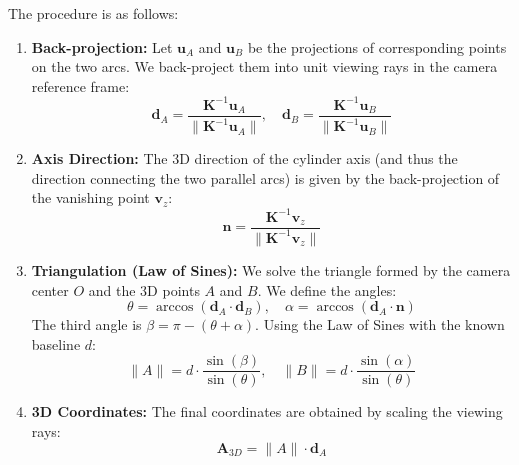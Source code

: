 \documentclass[a4paper,11pt]{article}
\newcommand{\matr}[1]{\bm{#1}}     %
\newcommand{\vect}[1]{\mathbf{#1}}  %
\begin{document}
The procedure is as follows:
\begin{enumerate}
    \item \textbf{Back-projection:} Let $\vect{u}_A$ and $\vect{u}_B$ be the projections of corresponding points on the two arcs. We back-project them into unit viewing rays in the camera reference frame:
    \begin{equation}
        \vect{d}_A = \frac{\matr{K}^{-1}\vect{u}_A}{\|\matr{K}^{-1}\vect{u}_A\|}, \quad \vect{d}_B = \frac{\matr{K}^{-1}\vect{u}_B}{\|\matr{K}^{-1}\vect{u}_B\|}
    \end{equation}
    
    \item \textbf{Axis Direction:} The 3D direction of the cylinder axis (and thus the direction connecting the two parallel arcs) is given by the back-projection of the vanishing point $\vect{v}_z$:
    \begin{equation}
        \vect{n} = \frac{\matr{K}^{-1}\vect{v}_z}{\|\matr{K}^{-1}\vect{v}_z\|}
    \end{equation}
    
    \item \textbf{Triangulation (Law of Sines):} We solve the triangle formed by the camera center $O$ and the 3D points $A$ and $B$. We define the angles:
    \begin{equation}
        \theta = \arccos(\vect{d}_A \cdot \vect{d}_B), \quad \alpha = \arccos(\vect{d}_A \cdot \vect{n})
    \end{equation}
    The third angle is $\beta = \pi - (\theta + \alpha)$. Using the Law of Sines with the known baseline $d$:
    \begin{equation}
        \|A\| = d \cdot \frac{\sin(\beta)}{\sin(\theta)}, \quad \|B\| = d \cdot \frac{\sin(\alpha)}{\sin(\theta)}
    \end{equation}
    
    \item \textbf{3D Coordinates:} The final coordinates are obtained by scaling the viewing rays:
    \begin{equation}
        \vect{A}_{3D} = \|A\| \cdot \vect{d}_A
    \end{equation}
\end{enumerate}
\end{document}
